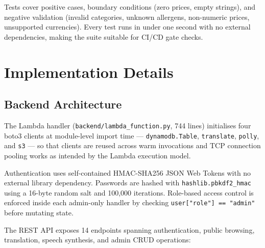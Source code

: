 \documentclass[conference]{IEEEtran}
\begin{document}
Tests cover positive cases, boundary conditions (zero prices, empty strings), and negative validation (invalid categories, unknown allergens, non-numeric prices, unsupported currencies). Every test runs in under one second with no external dependencies, making the suite suitable for CI/CD gate checks.

\section{Implementation Details}

\subsection{Backend Architecture}

The Lambda handler (\texttt{backend/lambda\_function.py}, 744 lines) initialises four boto3 clients at module-level import time --- \texttt{dynamodb.Table}, \texttt{translate}, \texttt{polly}, and \texttt{s3} --- so that clients are reused across warm invocations and TCP connection pooling works as intended by the Lambda execution model.

Authentication uses self-contained HMAC-SHA256 JSON Web Tokens with no external library dependency. Passwords are hashed with \texttt{hashlib.pbkdf2\_hmac} using a 16-byte random salt and 100,000 iterations. Role-based access control is enforced inside each admin-only handler by checking \texttt{user["role"] == "admin"} before mutating state.

The REST API exposes 14 endpoints spanning authentication, public browsing, translation, speech synthesis, and admin CRUD operations:
\end{document}
